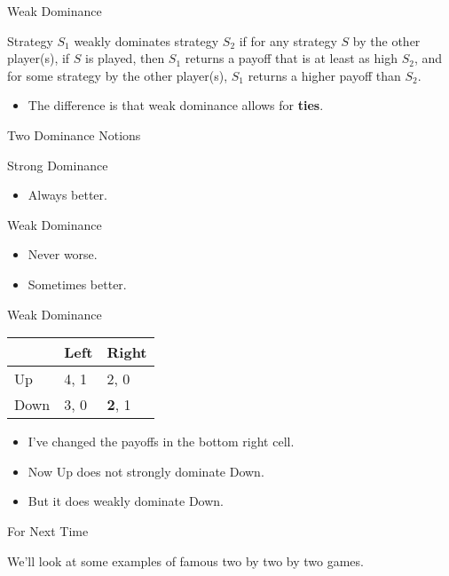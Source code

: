 \documentclass[
  ignorenonframetext,
]{beamer}
\providecommand{\tightlist}{%
  \setlength{\itemsep}{0pt}\setlength{\parskip}{0pt}}
\begin{document}
\begin{frame}{Weak Dominance}
\protect\hypertarget{weak-dominance}{}

Strategy \(S_1\) weakly dominates strategy \(S_2\) if for any strategy
\(S\) by the other player(s), if \(S\) is played, then \(S_1\) returns a
payoff that is at least as high \(S_2\), and for some strategy by the
other player(s), \(S_1\) returns a higher payoff than \(S_2\).

\begin{itemize}
\tightlist
\item
  The difference is that weak dominance allows for \textbf{ties}.
\end{itemize}

\end{frame}

\begin{frame}{Two Dominance Notions}
\protect\hypertarget{two-dominance-notions}{}

Strong Dominance

\begin{itemize}
\tightlist
\item
  Always better.
\end{itemize}

Weak Dominance

\begin{itemize}
\tightlist
\item
  Never worse.
\item
  Sometimes better.
\end{itemize}

\end{frame}

\begin{frame}{Weak Dominance}
\protect\hypertarget{weak-dominance-1}{}

\begin{table}[!h]
\centering
\begin{tabular}[t]{>{}l|ll}
\toprule
 & Left & Right\\
\midrule
Up & 4, 1 & 2, 0\\
Down & 3, 0 & \textbf{2}, 1\\
\bottomrule
\end{tabular}
\end{table}

\begin{itemize}
\tightlist
\item
  I've changed the payoffs in the bottom right cell.
\item
  Now Up does not strongly dominate Down.
\item
  But it does weakly dominate Down.
\end{itemize}

\end{frame}

\begin{frame}{For Next Time}
\protect\hypertarget{for-next-time}{}

We'll look at some examples of famous two by two by two games.

\end{frame}
\end{document}
